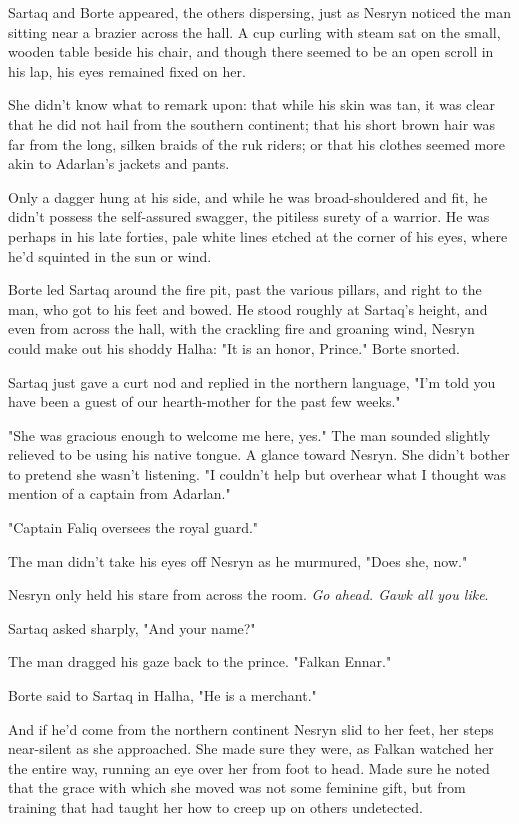 Sartaq and Borte appeared, the others dispersing, just as Nesryn noticed the man sitting near a brazier across the hall. A cup curling with steam sat on the small, wooden table beside his chair, and though there seemed to be an open scroll in his lap, his eyes remained fixed on her.

She didn't know what to remark upon: that while his skin was tan, it was clear that he did not hail from the southern continent; that his short brown hair was far from the long, silken braids of the ruk riders; or that his clothes seemed more akin to Adarlan's jackets and pants.

Only a dagger hung at his side, and while he was broad-shouldered and fit, he didn't possess the self-assured swagger, the pitiless surety of a warrior. He was perhaps in his late forties, pale white lines etched at the corner of his eyes, where he'd squinted in the sun or wind.

Borte led Sartaq around the fire pit, past the various pillars, and right to the man, who got to his feet and bowed. He stood roughly at Sartaq's height, and even from across the hall, with the crackling fire and groaning wind, Nesryn could make out his shoddy Halha: "It is an honor, Prince." Borte snorted.

Sartaq just gave a curt nod and replied in the northern language, "I'm told you have been a guest of our hearth-mother for the past few weeks."

"She was gracious enough to welcome me here, yes." The man sounded slightly relieved to be using his native tongue. A glance toward Nesryn. She didn't bother to pretend she wasn't listening. "I couldn't help but overhear what I thought was mention of a captain from Adarlan."

"Captain Faliq oversees the royal guard."

The man didn't take his eyes off Nesryn as he murmured, "Does she, now."

Nesryn only held his stare from across the room. \emph{Go ahead. Gawk all you like}.

Sartaq asked sharply, "And your name?"

The man dragged his gaze back to the prince. "Falkan Ennar."

Borte said to Sartaq in Halha, "He is a merchant."

And if he'd come from the northern continent  Nesryn slid to her feet, her steps near-silent as she approached. She made sure they were, as Falkan watched her the entire way, running an eye over her from foot to head. Made sure he noted that the grace with which she moved was not some feminine gift, but from training that had taught her how to creep up on others undetected.

